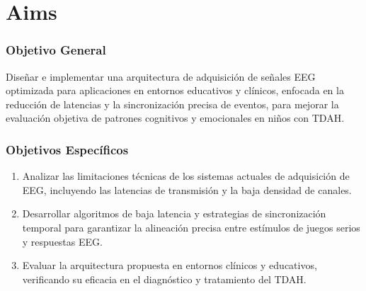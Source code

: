 \chapter{Aims}

\subsection{Objetivo General}
Diseñar e implementar una arquitectura de adquisición de señales EEG optimizada para aplicaciones en entornos educativos y clínicos, enfocada en la reducción de latencias y la sincronización precisa de eventos, para mejorar la evaluación objetiva de patrones cognitivos y emocionales en niños con TDAH.

\subsection{Objetivos Específicos}
\begin{enumerate}
    \item Analizar las limitaciones técnicas de los sistemas actuales de adquisición de EEG, incluyendo las latencias de transmisión y la baja densidad de canales.
    \item Desarrollar algoritmos de baja latencia y estrategias de sincronización temporal para garantizar la alineación precisa entre estímulos de juegos serios y respuestas EEG.
    \item Evaluar la arquitectura propuesta en entornos clínicos y educativos, verificando su eficacia en el diagnóstico y tratamiento del TDAH.
\end{enumerate}
